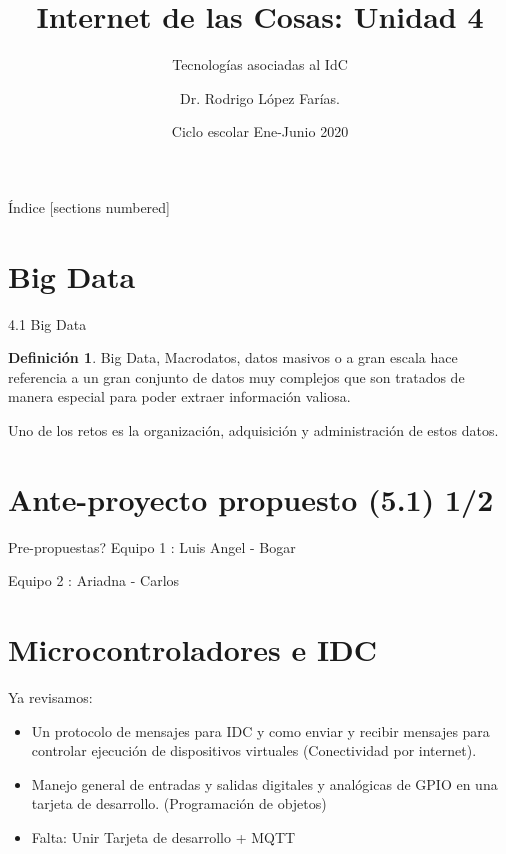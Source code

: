\documentclass{beamer}
\title{Internet de las Cosas:  Unidad 4}
\subtitle{Tecnologías asociadas al IdC}
\author{Dr. Rodrigo López Farías. \\}
\institute{Instituto Tecnológico de Querétaro \\ Ingeniería en Sistemas Computacionales}
\date{Ciclo escolar Ene-Junio 2020}
\theoremstyle{definition}
\newtheorem{defn}{Definici\'{o}n}[section]
\begin{document}
\frame{\maketitle}


\begin{frame}{Índice}
  [sections numbered]
  \tableofcontents[hideallsubsections]
\end{frame}





\section{Big Data}




\begin{frame}{4.1 Big Data}






\begin{defn}
Big Data, Macrodatos, datos masivos o a gran escala hace referencia a un gran conjunto de datos muy complejos que son tratados de manera especial para poder extraer información valiosa.
\end{defn}

Uno de los retos es la organización, adquisición y administración de estos datos.



\end{frame}

\section{Ante-proyecto propuesto (5.1) 1/2}

\begin{frame}{Pre-propuestas?}
Equipo 1 :  Luis Angel - Bogar

Equipo 2 :  Ariadna - Carlos

\end{frame}

\section{Microcontroladores e IDC}

\begin{frame}
Ya revisamos:
\begin{itemize}
\item Un protocolo de mensajes para IDC y como enviar y recibir mensajes para controlar ejecución de dispositivos virtuales (Conectividad por internet). 
\item Manejo general de entradas y salidas digitales y analógicas de GPIO en una tarjeta de desarrollo. (Programación de objetos) 
\item Falta: Unir Tarjeta de desarrollo + MQTT 
\end{itemize}


\end{frame}
\end{document}
